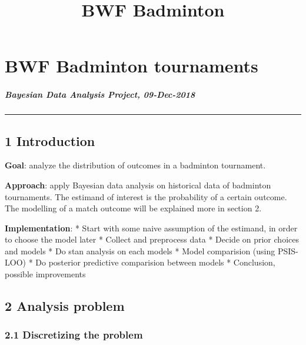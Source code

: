 \documentclass[11pt]{article}
\title{BWF Badminton}
\begin{document}
    
    
    \maketitle
    
    

    
    \hypertarget{bwf-badminton-tournaments}{%
\section{BWF Badminton tournaments}\label{bwf-badminton-tournaments}}

\hypertarget{bayesian-data-analysis-project-09-dec-2018}{%
\subparagraph{Bayesian Data Analysis Project,
09-Dec-2018}\label{bayesian-data-analysis-project-09-dec-2018}}

\begin{center}\rule{0.5\linewidth}{\linethickness}\end{center}

    \hypertarget{introduction}{%
\subsection{1 Introduction}\label{introduction}}

\textbf{Goal}: analyze the distribution of outcomes in a badminton
tournament.

\textbf{Approach}: apply Bayesian data analysis on historical data of
badminton tournaments. The estimand of interest is the probability of a
certain outcome. The modelling of a match outcome will be explained more
in section 2.

\textbf{Implementation}: * Start with some naive assumption of the
estimand, in order to choose the model later * Collect and preprocess
data * Decide on prior choices and models * Do stan analysis on each
models * Model comparision (using PSIS-LOO) * Do posterior predictive
comparision between models * Conclusion, possible improvements

\hypertarget{analysis-problem}{%
\subsection{2 Analysis problem}\label{analysis-problem}}

\hypertarget{discretizing-the-problem}{%
\subsubsection{2.1 Discretizing the
problem}\label{discretizing-the-problem}}
\end{document}
